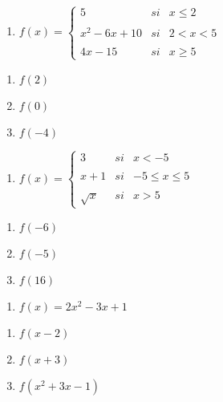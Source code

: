 \documentclass[]{book}
\providecommand{\tightlist}{%
  \setlength{\itemsep}{0pt}\setlength{\parskip}{0pt}}
\theoremstyle{definition}
\theoremstyle{definition}
\theoremstyle{definition}
\theoremstyle{remark}
\begin{document}
\begin{enumerate}
\def\labelenumi{\arabic{enumi}.}
\setcounter{enumi}{6}
\tightlist
\item
  \(f(x)= \left\{ \begin{array}{lcc} 5 & si & x \leq 2 \\ \\ x^2-6x+10 & si & 2 < x < 5 \\ \\ 4x-15 & si & x \geq 5 \end{array} \right.\)
\end{enumerate}

\begin{enumerate}
\def\labelenumi{\alph{enumi}.}
\tightlist
\item
  \(f(2)\)
\item
  \(f(0)\)
\item
  \(f(-4)\)
\end{enumerate}

\begin{enumerate}
\def\labelenumi{\arabic{enumi}.}
\setcounter{enumi}{7}
\tightlist
\item
  \(f(x)= \left\{ \begin{array}{lcc} 3 & si & x <-5 \\ \\ x+1 & si & -5 \leq x \leq 5 \\ \\ \sqrt{x} & si & x > 5 \end{array} \right.\)
\end{enumerate}

\begin{enumerate}
\def\labelenumi{\alph{enumi}.}
\tightlist
\item
  \(f(-6)\)
\item
  \(f(-5)\)
\item
  \(f(16)\)
\end{enumerate}

\begin{enumerate}
\def\labelenumi{\arabic{enumi}.}
\setcounter{enumi}{8}
\tightlist
\item
  \(f(x)=2x^{2}-3x+1\)
\end{enumerate}

\begin{enumerate}
\def\labelenumi{\alph{enumi}.}
\tightlist
\item
  \(f(x-2)\)
\item
  \(f(x+3)\)
\item
  \(f(x^{2}+3x-1)\)
\end{enumerate}
\end{document}
